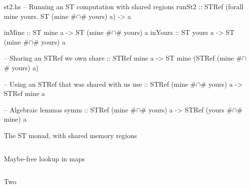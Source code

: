\documentclass{beamer}
\begin{document}
\begin{filecontents*}{st2.hs}
-- Running an ST computation with shared regions
runSt2  ::
  STRef (forall mine yours. ST (mine #$\cap$# yours) a) -> a

inMine  :: ST mine  a -> ST (mine #$\cap$# yours) a
inYours :: ST yours a -> ST (mine #$\cap$# yours) a

-- Sharing an STRef we own
share  :: STRef mine a -> ST mine (STRef (mine #$\cap$# yours) a)

-- Using an STRef that was shared with us
use    :: STRef (mine #$\cap$# yours) a -> STRef mine a

-- Algebraic lemmas
symm   :: STRef (mine #$\cap$# yours) a -> STRef (yours #$\cap$# mine) a

\end{filecontents*}

\begin{frame}{}\end{frame}

\usebackgroundtemplate{}
\begin{frame}{The ST monad, with shared memory regions}
  \inputminted{haskell}{st2.hs}
\end{frame}

\begin{frame}{Maybe-free lookup in maps}
  \inputminted{haskell}{jmap.hs}
\end{frame}

\begin{frame}{Two}

\end{frame}
\end{document}
